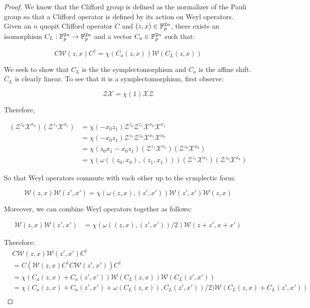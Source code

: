\begin{proof}
We know that the Clifford group is defined as the normalizer of the Pauli group so that a Clifford operator is defined by its action on Weyl operators. Given an $n$ quopit Clifford operator $C$  and $(z,x)\in \mathbb{F}_p^{2n}$, there exists  an isomorphism $C_L:\mathbb{F}_p^{2n}\to \mathbb{F}_p^{2n}$ and a vector  $C_a\in \mathbb{F}_p^{2n}$ such that:

$$
C {\mathcal W}(z,x) C^\dag
=
\chi(C_a(z,x)){\mathcal W}(C_L(z,x))
$$


We seek to show that $C_L$ is the the symplectomorphism and $C_a$ is the affine shift.  $C_L$ is clearly linear.  To see that it is a symplectomorphism, first observe:

$$
\mathcal{Z}\mathcal{X}  = \chi(1)\mathcal{X} \mathcal{Z}
$$

Therefore, 


\begin{align*}
(\mathcal{Z}^{z_0}\mathcal{X}^{x_0})(\mathcal{Z}^{z_1}\mathcal{X}^{x_1} )
&=\chi(-x_0z_1) \mathcal{Z}^{z_0}\mathcal{Z}^{z_1}\mathcal{X}^{x_0}\mathcal{X}^{x_1}  \\
&=\chi(-x_0z_1)\mathcal{Z}^{z_1}  \mathcal{Z}^{z_0}\mathcal{X}^{x_1} \mathcal{X}^{x_0}  \\
&=\chi(z_0x_1-x_0z_1)(\mathcal{Z}^{z_1} \mathcal{X}^{x_1})(  \mathcal{Z}^{z_0}\mathcal{X}^{x_0} ) \\
&=\chi(\omega((z_0,x_0),(z_1,x_1)))(\mathcal{Z}^{z_1} \mathcal{X}^{x_1})(  \mathcal{Z}^{z_0}\mathcal{X}^{x_0} ) 
\end{align*}

So that Weyl operators commute with each other up to the symplectic form:

$$
{\mathcal W}(z,x) {\mathcal W}(z',x') = \chi(\omega(z,x),(z',x')) {\mathcal W}(z',x') {\mathcal W}(z,x) $$

Moreover, we can combine Weyl operators together as follows:

\begin{align*}
{\mathcal W}(z,x) {\mathcal W}(z',x')
&=\chi(\omega((z,x),(z',x'))/2){\mathcal W}(z+z',x+x') 
\end{align*}


Therefore:
\begin{align*}
&C\mathcal{W}(z,x)\mathcal{W}(z',x')C^\dag\\
&=C(\mathcal{W}(z,x) C^\dag C \mathcal{W}(z',x'))C^\dag\\
&=\chi(C_a(z,x)+C_a(z',x')) \mathcal{W}(C_L(z,x))\mathcal{W}(C_L(z',x')) \\
&=\chi(C_a(z,x)+C_a(z',x')+\omega(C_L(z,x)),C_L(z',x'))/2)  \mathcal{W}(C_L(z,x)+C_L(z',x')) \\
\end{align*}


\end{proof}
